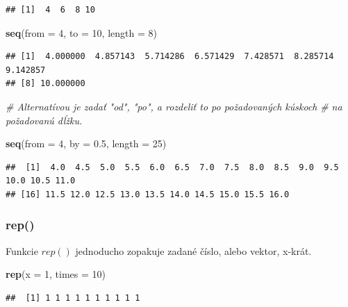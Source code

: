 \documentclass[]{article}
\newenvironment{Shaded}{\begin{snugshade}}{\end{snugshade}}
\newcommand{\CommentTok}[1]{\textcolor[rgb]{0.56,0.35,0.01}{\textit{#1}}}
\newcommand{\DataTypeTok}[1]{\textcolor[rgb]{0.13,0.29,0.53}{#1}}
\newcommand{\DecValTok}[1]{\textcolor[rgb]{0.00,0.00,0.81}{#1}}
\newcommand{\FloatTok}[1]{\textcolor[rgb]{0.00,0.00,0.81}{#1}}
\newcommand{\KeywordTok}[1]{\textcolor[rgb]{0.13,0.29,0.53}{\textbf{#1}}}
\newcommand{\NormalTok}[1]{#1}
\begin{document}
\begin{verbatim}
## [1]  4  6  8 10
\end{verbatim}

\begin{Shaded}
\begin{Highlighting}[]
\KeywordTok{seq}\NormalTok{(}\DataTypeTok{from =} \DecValTok{4}\NormalTok{, }\DataTypeTok{to =} \DecValTok{10}\NormalTok{, }\DataTypeTok{length =} \DecValTok{8}\NormalTok{)}
\end{Highlighting}
\end{Shaded}

\begin{verbatim}
## [1]  4.000000  4.857143  5.714286  6.571429  7.428571  8.285714  9.142857
## [8] 10.000000
\end{verbatim}

\begin{Shaded}
\begin{Highlighting}[]
\CommentTok{# Alternatívou je zadať "od", "po", a rozdeliť to po požadovaných kúskoch}
\CommentTok{# na požadovanú dĺžku.}

\KeywordTok{seq}\NormalTok{(}\DataTypeTok{from =} \DecValTok{4}\NormalTok{, }\DataTypeTok{by =} \FloatTok{0.5}\NormalTok{, }\DataTypeTok{length =} \DecValTok{25}\NormalTok{)}
\end{Highlighting}
\end{Shaded}

\begin{verbatim}
##  [1]  4.0  4.5  5.0  5.5  6.0  6.5  7.0  7.5  8.0  8.5  9.0  9.5 10.0 10.5 11.0
## [16] 11.5 12.0 12.5 13.0 13.5 14.0 14.5 15.0 15.5 16.0
\end{verbatim}

\hypertarget{rep}{%
\subsubsection{rep()}\label{rep}}

Funkcie \(rep()\) jednoducho zopakuje zadané číslo, alebo vektor,
x-krát.

\begin{Shaded}
\begin{Highlighting}[]
\KeywordTok{rep}\NormalTok{(}\DataTypeTok{x =} \DecValTok{1}\NormalTok{, }\DataTypeTok{times =} \DecValTok{10}\NormalTok{)}
\end{Highlighting}
\end{Shaded}

\begin{verbatim}
##  [1] 1 1 1 1 1 1 1 1 1 1
\end{verbatim}
\end{document}
